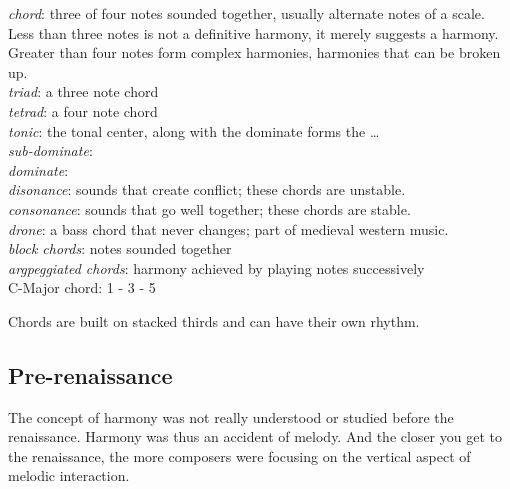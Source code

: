 \documentclass[letter,twoside,twocolumn]{article}
\begin{document}
\emph{chord}: three of four notes sounded together, usually alternate notes of a scale.
 Less than three notes is not a definitive harmony, it merely suggests a harmony.
 Greater than four notes form complex harmonies, harmonies that can be broken up. \\

\emph{triad}: a three note chord \\

\emph{tetrad}: a four note chord \\

\emph{tonic}: the tonal center, along with the dominate forms the \ldots{} \\

\emph{sub-dominate}: \\

\emph{dominate}: \\

\emph{disonance}: sounds that create conflict; these chords are unstable. \\

\emph{consonance}: sounds that go well together; these chords are stable. \\

\emph{drone}: a bass chord that never changes; part of medieval western music. \\

\emph{block chords}: notes sounded together \\

\emph{argpeggiated chords}: harmony achieved by playing notes successively \\

C-Major chord: 1 - 3 - 5

Chords are built on stacked thirds and can have their own rhythm.
\subsection{Pre-renaissance}
\label{sec-2-2}
The concept of harmony was not really understood or studied before
the renaissance. Harmony was thus an accident of melody. And the closer
you get to the renaissance, the more composers were focusing on the
vertical aspect of melodic interaction.
\end{document}
